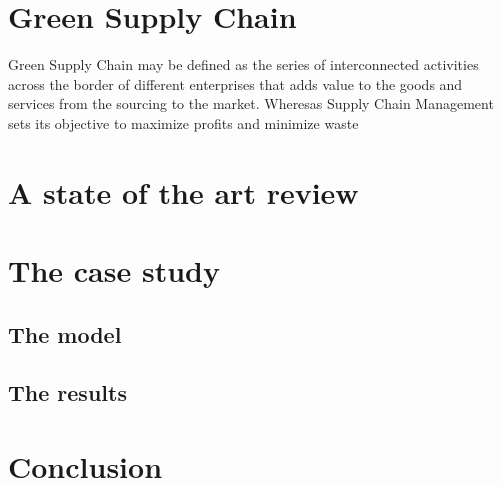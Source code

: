\documentclass{article}
\begin{document}
\section{Green Supply Chain}
Green Supply Chain may be defined as the series of interconnected activities across the border of different enterprises that adds value to the goods and services from the sourcing to the market. Wheresas Supply Chain Management sets its objective to maximize profits and minimize waste 


\section{A state of the art review}

\section{The case study}
\subsection{The model}
\subsection{The results}

\section{Conclusion}
\end{document}
